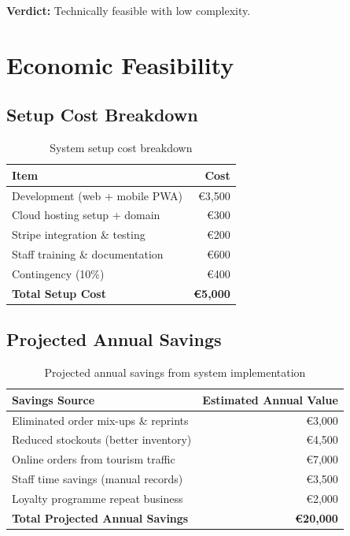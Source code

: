 \documentclass[12pt, a4paper]{report}
\begin{document}
\begin{verdictbox}
\textbf{Verdict:} Technically feasible with low complexity.
\end{verdictbox}

\section{Economic Feasibility}

\subsection*{Setup Cost Breakdown}

\begin{table}[H]
  \centering
  \begin{tabularx}{\textwidth}{X r}
    \toprule
    \textbf{Item} & \textbf{Cost} \\
    \midrule
    Development (web + mobile PWA)   & \euro{}3,500 \\
    Cloud hosting setup + domain     & \euro{}300   \\
    Stripe integration \& testing    & \euro{}200   \\
    Staff training \& documentation  & \euro{}600   \\
    Contingency (10\%)               & \euro{}400   \\
    \midrule
    \textbf{Total Setup Cost}        & \textbf{\euro{}5,000} \\
    \bottomrule
  \end{tabularx}
  \caption{System setup cost breakdown}
\end{table}

\subsection*{Projected Annual Savings}

\begin{table}[H]
  \centering
  \begin{tabularx}{\textwidth}{X r}
    \toprule
    \textbf{Savings Source} & \textbf{Estimated Annual Value} \\
    \midrule
    Eliminated order mix-ups \& reprints  & \euro{}3,000  \\
    Reduced stockouts (better inventory)  & \euro{}4,500  \\
    Online orders from tourism traffic    & \euro{}7,000  \\
    Staff time savings (manual records)   & \euro{}3,500  \\
    Loyalty programme repeat business     & \euro{}2,000  \\
    \midrule
    \textbf{Total Projected Annual Savings} & \textbf{\euro{}20,000} \\
    \bottomrule
  \end{tabularx}
  \caption{Projected annual savings from system implementation}
\end{table}
\end{document}
